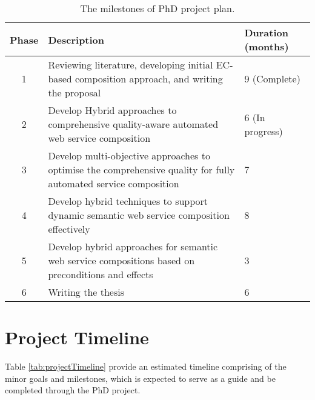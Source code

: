 \begin{table}
\small
\centering
\caption{The milestones of PhD project plan.}
\vspace{0.2cm}
\begin{tabular}{|c|p{100mm}|l|}
\hline
Phase & Description & Duration (months) \\ \hline
1 & Reviewing literature, developing initial EC-based composition approach, and writing the proposal & 9 (Complete)  \\
2 & Develop Hybrid approaches to comprehensive quality-aware automated web service composition & 6 (In progress) \\
3 & Develop multi-objective approaches to optimise the comprehensive quality for fully automated service composition & 7 \\
4 & Develop hybrid techniques to support dynamic semantic web service composition effectively & 8 \\
5 & Develop hybrid approaches for semantic web service compositions based on preconditions and effects & 3 \\
6 & Writing the thesis & 6 \\ \hline
\end{tabular}
\label{tab:projectOverview}
\end{table}

\section{Project Timeline}

Table \ref{tab:projectTimeline} provide an estimated timeline comprising of the minor goals and milestones, which is expected to serve as a guide and be completed through the PhD project.

